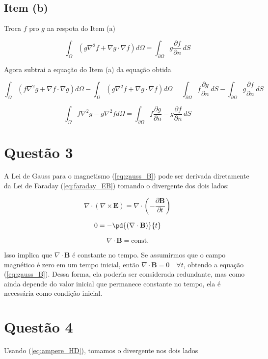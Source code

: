 \section{Item (b)}

Troca $f$ pro $g$ na respota do Item (a)

\[
\int_{\Omega} \left( g \nabla^2 f + \nabla g \cdot \nabla f \right) d\Omega
= \int_{\partial \Omega} g \frac{\partial f}{\partial n} \, dS
\]

Agora subtrai a equação do Item (a) da equação obtida

\[
\int_{\Omega} \left( f \nabla^2 g + \nabla f \cdot \nabla g \right) d\Omega
- \int_{\Omega} \left( g \nabla^2 f + \nabla g \cdot \nabla f \right) d\Omega
= \int_{\partial \Omega} f \frac{\partial g}{\partial n} \, dS
- \int_{\partial \Omega} g \frac{\partial f}{\partial n} \, dS
\]

\[
\int_{\Omega} f \nabla^2 g - g \nabla^2 f d\Omega
= \int_{\partial \Omega} f \frac{\partial g}{\partial n} - g \frac{\partial f}{\partial n} \, dS
\]


\chapter{Questão 3}\label{cap:q3}

A Lei de Gauss para o magnetismo (\ref{eq:gauss_B}) pode ser derivada diretamente da Lei de Faraday 
(\ref{eq:faraday_EB}) tomando o divergente 
dos dois lados:

\[ \nabla \cdot \left( \nabla \times \mathbf{E} \right)  = \nabla \cdot \left( -\frac{\partial \mathbf{B}}{\partial t} \right) \]  

\[ 0  = - \pd{(\nabla \cdot \mathbf{B})}{t} \] 

\[ \nabla \cdot \mathbf{B} = \text{const.} \] 

Isso implica que $\nabla \cdot \mathbf{B}$ é constante no tempo. Se assumirmos que o campo magnético é zero em um tempo inicial, 
então $\nabla \cdot \mathbf{B} = 0 \quad \forall t$, obtendo a equação (\ref{eq:gauss_B}).
Dessa forma, ela poderia ser considerada redundante, mas como ainda depende do valor inicial que permanece 
constante no tempo, ela é necessária como condição inicial. 

\chapter{Questão 4}\label{cap:q4}

Usando (\ref{eq:ampere_HD}), tomamos o divergente nos dois lados

